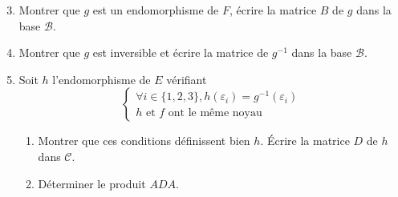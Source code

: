 \begin{enumerate} \setcounter{enumi}{2}
 \item Montrer que $g$  est un endomorphisme de $F$, écrire la matrice $B$ de $g$ dans la base $\mathcal B$.
\item Montrer que $g$ est inversible et écrire la matrice de $g^{-1}$ dans la base $\mathcal B$.
\item Soit $h$ l'endomorphisme de $E$ vérifiant
\begin{displaymath}
\left\lbrace 
\begin{aligned}
 \forall i \in \{1,2,3\}, h(\varepsilon_i)=g^{-1}(\varepsilon_i) \\
h \text{ et } f \text{ ont le même noyau}
\end{aligned}
\right.  
\end{displaymath}
\begin{enumerate}
\item Montrer que ces conditions définissent bien $h$. \'Ecrire la matrice $D$ de $h$ dans $\mathcal C$.
\item Déterminer le produit $ADA$.
\end{enumerate}
\end{enumerate}
